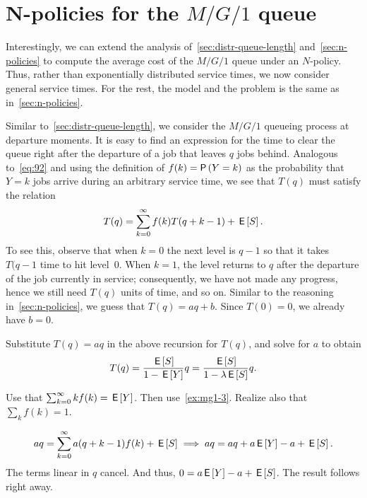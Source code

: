 \section{N-policies for the $M/G/1$ queue}
\label{sec:n-policies-mg1}

Interestingly, we can extend the analysis of~\cref{sec:distr-queue-length} and~\cref{sec:n-policies} to compute the average cost of the $M/G/1$ queue under an $N$-policy.
Thus, rather than exponentially distributed service times, we now consider general service times.
For the rest, the model and the problem is the same as in~\cref{sec:n-policies}. 



Similar to~\cref{sec:distr-queue-length}, we consider the $M/G/1$ queueing process at departure moments.
It is easy to find an expression for the time to clear the queue right after the departure of a job that leaves $q$ jobs behind.
Analogous to~\cref{eq:92} and using the definition of $f(k)=\P{Y=k}$ as the probability that $Y=k$ jobs arrive during an arbitrary service time, we see that $T(q)$ must satisfy the relation
\begin{equation*}
  T(q) = \sum_{k=0}^\infty f(k) T(q+k-1) + \,\mathsf{E}\left[S\right].
\end{equation*}
To see this, observe that when $k=0$ the next level is $q-1$ so that it takes $T(q-1$ time to hit level~$0$.
When $k=1$, the level returns to $q$ after the departure of the job currently in service; consequently, we have not made any progress, hence we still need $T(q)$ units of time,  and so on.
Similar to the reasoning in~\cref{sec:n-policies}, we guess that $T(q) = a q + b$. Since $T(0)=0$, we already have $b=0$. 

\begin{exercise}
Substitute $T(q) = a q$ in the above recursion for $T(q)$, and solve for $a$ to obtain
\begin{equation*}
  T(q) = \frac{\,\mathsf{E}\left[S\right]}{1- \,\mathsf{E}\left[Y\right]}q = \frac{\,\mathsf{E}\left[S\right]}{1-\lambda \,\mathsf{E}\left[S\right]}q.
\end{equation*}
\begin{hint}
  Use that $\sum_{k=0}^\infty k f(k) = \,\mathsf{E}\left[Y\right]$. Then use~\cref{ex:mg1-3}. Realize also that $\sum_k f(k) = 1$. 
\end{hint}
\begin{solution}
  \begin{align*}
    a q = \sum_{k=0}^\infty a (q+k-1) f(k) + \,\mathsf{E}\left[S\right] \implies a q = a q + a \,\mathsf{E}\left[Y\right] - a + \,\mathsf{E}\left[S\right].
  \end{align*}
The terms linear in $q$ cancel. And thus, $0=a\,\mathsf{E}\left[Y\right] - a + \,\mathsf{E}\left[S\right]$. The result follows right away.
\end{solution}
\end{exercise}

